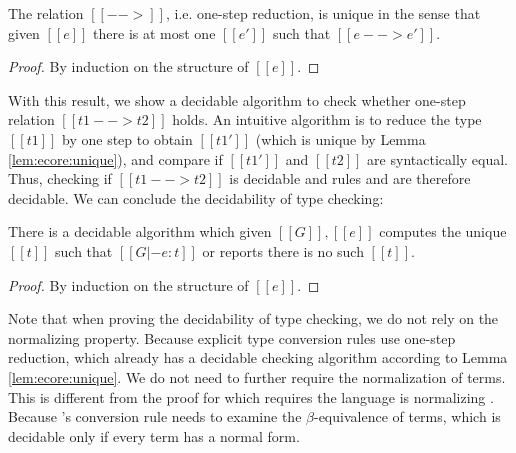 \begin{lem}\label{lem:ecore:unique}
	The relation $[[-->]]$, i.e. one-step reduction, is unique in the sense that given $[[e]]$ there is at most one $[[e']]$ such that $[[e --> e']]$.
\end{lem}

\begin{proof}
	By induction on the structure of $[[e]]$.
\end{proof}

With this result, we show a decidable algorithm to check whether one-step relation $[[t1 --> t2]]$ holds. An intuitive algorithm is to reduce the type $[[t1]]$ by one step to obtain $[[t1']]$ (which is unique by Lemma \ref{lem:ecore:unique}), and compare if $[[t1']]$ and $[[t2]]$ are syntactically equal. Thus, checking if $[[t1 --> t2]]$ is decidable and rules  and  are therefore decidable. We can conclude the decidability of type checking:

\begin{lem}\label{lem:ecore:decide}
	There is a decidable algorithm which given $[[G]], [[e]]$ computes the unique $[[t]]$ such that $[[G |- e:t]]$ or reports there is no such $[[t]]$.
\end{lem}

\begin{proof}
	By induction on the structure of $[[e]]$.
\end{proof}

Note that when proving the decidability of type checking, we do not rely on the normalizing property. Because explicit type conversion rules use one-step reduction, which already has a decidable checking algorithm according to Lemma \ref{lem:ecore:unique}. We do not need to further require the normalization of terms. This is different from the proof for \cc which requires the language is normalizing . Because \cc's conversion rule needs to examine the $\beta$-equivalence of terms, which is decidable only if every term has a normal form.

